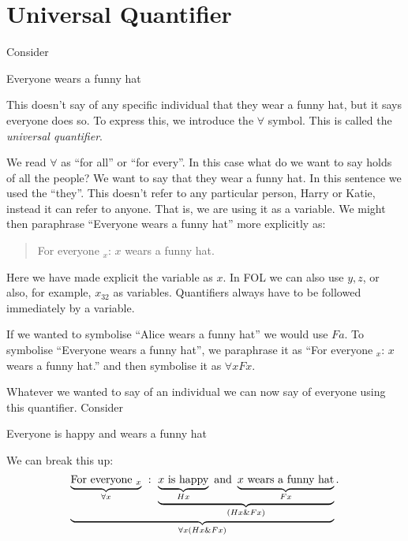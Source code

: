\section{Universal Quantifier}

Consider 
\begin{earg}
\item[\ex{q.hat}] Everyone wears a funny hat
\end{earg}
This doesn't say of any specific individual that they wear a funny hat, but it says everyone does so. To express this, we introduce the $\forall$ symbol. This is called the \emph{universal quantifier}.



We read $\forall$ as ``for all'' or ``for every''. In this case what do we want to say holds of all the people? We want to say that they wear a funny hat. In this sentence we used the ``they''. This doesn't refer to any particular person, Harry or Katie, instead it can refer to anyone. That is, we are using it as a variable. 
We might then paraphrase ``Everyone wears a funny hat'' more explicitly as:
\begin{quotation}
For everyone $_x$: $x$ wears a funny hat.
\end{quotation}

Here we have made explicit the variable as $x$. In FOL we can also use $y,z$, or also, for example, $x_{32}$ as variables. Quantifiers always have to be followed immediately by a variable. 


If we wanted to symbolise ``Alice wears a funny hat'' we would use $Fa$. To symbolise ``Everyone wears a funny hat'', we paraphrase it as ``For everyone $_x$: $x$ wears a funny hat.'' and then symbolise it as $\forall x Fx$. 


Whatever we wanted to say of an individual we can now say of everyone using this quantifier.  Consider
\begin{earg}
\item[\ex{q.hat}] Everyone is happy and wears a funny hat
\end{earg}
We can break this up:
\begin{equation*}
\underbrace{\underbrace{\text{For everyone $_x$}}_{\forall x}\ :\ 
 \underbrace{\underbrace{\text{$x$ is happy}}_{Hx}\text{ and }
 \underbrace{\text{$x$ wears a funny hat}}_{Fx}}_{(Hx\eand Fx)}}_{\forall x(Hx\eand Fx)}.
\end{equation*}

